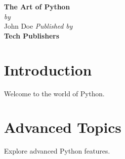 \documentclass[12pt,twoside]{book}
\newcommand{\booktitle}{ The Art of Python } %
\newcommand{\authorname}{ John Doe }
\begin{document}
\begin{titlepage}
    \begin{center}
        \vspace*{2cm}
        {\Huge\bfseries\booktitle}\\[1cm]
        {\Large\textit{by}}\\[0.5cm]
        {\Large\authorname}
        \vfill
        {\small\itshape Published by}\\
        {\small\bfseries{ Tech Publishers }}
        \vspace*{2cm}
    \end{center}
\end{titlepage}

\tableofcontents
\newpage

\chapter{ Introduction }
\begin{spacing}{1.5}
Welcome to the world of Python.
\end{spacing}
\newpage
\chapter{ Advanced Topics }
\begin{spacing}{1.5}
Explore advanced Python features.
\end{spacing}
\newpage
\end{document}
